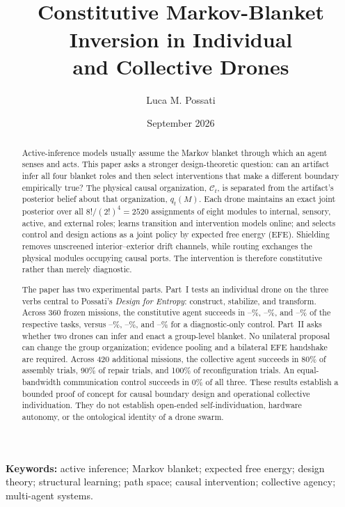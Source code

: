 \documentclass[11pt,a4paper]{article}
\title{\vspace{-1.1cm}{\color{navy}\LARGE\bfseries Designing the Boundary}\\[0.35em]
  {\large Constitutive Markov-Blanket Inversion in Individual\\
  and Collective Drones}}
\author{Luca M. Possati}
\date{September 2026}
\numberwithin{equation}{section}
\newcommand{\Corg}{\mathcal{C}}
\newcommand{\ConstructFull}{--}
\newcommand{\ConstructDiag}{--}
\newcommand{\StabilizeFull}{--}
\newcommand{\StabilizeDiag}{--}
\newcommand{\TransformFull}{--}
\newcommand{\TransformDiag}{--}
\begin{document}
\maketitle

\begin{abstract}
Active-inference models usually assume the Markov blanket through which an
agent senses and acts. This paper asks a stronger design-theoretic question:
can an artifact infer all four blanket roles and then select interventions
that make a different boundary empirically true? The physical causal
organization, $\Corg_t$, is separated from the artifact's posterior belief
about that organization, $q_t(M)$. Each drone maintains an exact joint
posterior over all $8!/(2!)^4=2520$ assignments of eight modules to internal,
sensory, active, and external roles; learns transition and intervention
models online; and selects control and design actions as a joint policy by
expected free energy (EFE). Shielding removes unscreened interior--exterior
drift channels, while routing exchanges the physical modules occupying causal
ports. The intervention is therefore constitutive rather than merely
diagnostic.

The paper has two experimental parts. Part~I tests an individual drone on the
three verbs central to Possati's \emph{Design for Entropy}: construct,
stabilize, and transform. Across 360 frozen missions, the constitutive agent
succeeds in \ConstructFull\%, \StabilizeFull\%, and \TransformFull\% of the
respective tasks, versus \ConstructDiag\%, \StabilizeDiag\%, and
\TransformDiag\% for a diagnostic-only control. Part~II asks whether two
drones can infer and enact a group-level blanket. No unilateral proposal can
change the group organization; evidence pooling and a bilateral EFE
handshake are required. Across 420 additional missions, the collective agent
succeeds in 80\% of assembly trials, 90\% of repair trials, and 100\% of
reconfiguration trials. An equal-bandwidth communication control succeeds in
0\% of all three. These results establish a bounded proof of concept for
causal boundary design and operational collective individuation. They do not
establish open-ended self-individuation, hardware autonomy, or the ontological
identity of a drone swarm.
\end{abstract}

\noindent\textbf{Keywords:} active inference; Markov blanket; expected free
energy; design theory; structural learning; path space; causal intervention;
collective agency; multi-agent systems.
\end{document}
